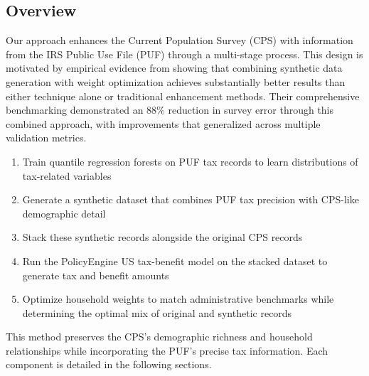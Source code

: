 \subsection{Overview}

Our approach enhances the Current Population Survey (CPS) with information from the IRS Public Use File (PUF) through a multi-stage process. This design is motivated by empirical evidence from \citet{woodruff2023survey} showing that combining synthetic data generation with weight optimization achieves substantially better results than either technique alone or traditional enhancement methods. Their comprehensive benchmarking demonstrated an 88\% reduction in survey error through this combined approach, with improvements that generalized across multiple validation metrics.

\begin{enumerate}
    \item Train quantile regression forests on PUF tax records to learn distributions of tax-related variables
    \item Generate a synthetic dataset that combines PUF tax precision with CPS-like demographic detail
    \item Stack these synthetic records alongside the original CPS records
    \item Run the PolicyEngine US tax-benefit model on the stacked dataset to generate tax and benefit amounts
    \item Optimize household weights to match administrative benchmarks while determining the optimal mix of original and synthetic records
\end{enumerate}

This method preserves the CPS's demographic richness and household relationships while incorporating the PUF's precise tax information. Each component is detailed in the following sections.